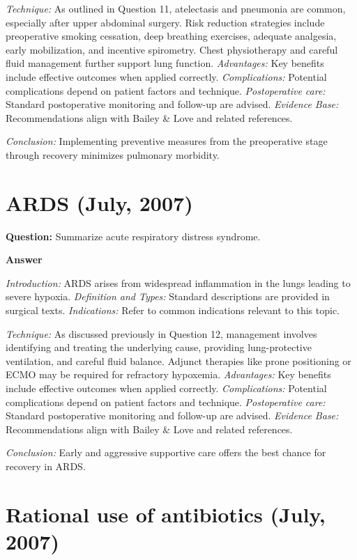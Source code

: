 \documentclass{article}
\begin{document}
\emph{Technique:} As outlined in Question 11, atelectasis and pneumonia are common, especially after upper abdominal surgery. Risk reduction strategies include preoperative smoking cessation, deep breathing exercises, adequate analgesia, early mobilization, and incentive spirometry. Chest physiotherapy and careful fluid management further support lung function.
\emph{Advantages:} Key benefits include effective outcomes when applied correctly.
\emph{Complications:} Potential complications depend on patient factors and technique.
\emph{Postoperative care:} Standard postoperative monitoring and follow-up are advised.
\emph{Evidence Base:} Recommendations align with Bailey & Love and related references.

\emph{Conclusion:} Implementing preventive measures from the preoperative stage through recovery minimizes pulmonary morbidity.


\section{ARDS (July, 2007)}

\textbf{Question:} Summarize acute respiratory distress syndrome.

\textbf{Answer}

\emph{Introduction:} ARDS arises from widespread inflammation in the lungs leading to severe hypoxia.
\emph{Definition and Types:} Standard descriptions are provided in surgical texts.
\emph{Indications:} Refer to common indications relevant to this topic.

\emph{Technique:} As discussed previously in Question 12, management involves identifying and treating the underlying cause, providing lung-protective ventilation, and careful fluid balance. Adjunct therapies like prone positioning or ECMO may be required for refractory hypoxemia.
\emph{Advantages:} Key benefits include effective outcomes when applied correctly.
\emph{Complications:} Potential complications depend on patient factors and technique.
\emph{Postoperative care:} Standard postoperative monitoring and follow-up are advised.
\emph{Evidence Base:} Recommendations align with Bailey & Love and related references.

\emph{Conclusion:} Early and aggressive supportive care offers the best chance for recovery in ARDS.


\section{Rational use of antibiotics (July, 2007)}
\end{document}
